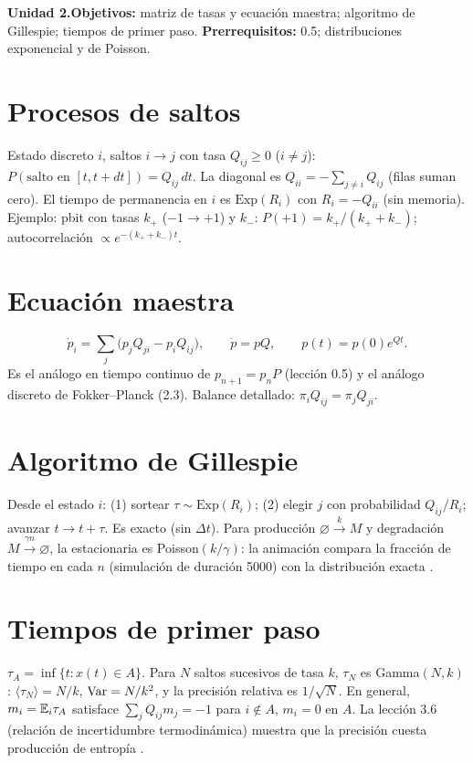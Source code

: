 \documentclass[11pt,a4paper]{article}
\begin{document}

\noindent\textbf{Unidad 2.}\quad\textbf{Objetivos:} matriz de tasas y ecuación maestra; algoritmo de Gillespie; tiempos de
primer paso. \textbf{Prerrequisitos:} 0.5; distribuciones exponencial y de Poisson.

\section{Procesos de saltos}
Estado discreto $i$, saltos $i\to j$ con tasa $Q_{ij}\ge0$ ($i\ne j$): $P(\text{salto en }[t,t+dt])=Q_{ij}\,dt$. La diagonal es
$Q_{ii}=-\sum_{j\ne i}Q_{ij}$ (filas suman cero). El tiempo de permanencia en $i$ es $\mathrm{Exp}(R_i)$ con $R_i=-Q_{ii}$ (sin memoria).
Ejemplo: pbit con tasas $k_+$ ($-1\to+1$) y $k_-$: $P(+1)=k_+/(k_++k_-)$; autocorrelación $\propto e^{-(k_++k_-)t}$.

\section{Ecuación maestra}
\begin{equation}\dot p_i=\sum_j\big(p_jQ_{ji}-p_iQ_{ij}\big),\qquad\dot p=pQ,\qquad p(t)=p(0)e^{Qt}.\end{equation}
Es el análogo en tiempo continuo de $p_{n+1}=p_nP$ (lección 0.5) y el análogo discreto de Fokker--Planck (2.3). Balance detallado:
$\pi_iQ_{ij}=\pi_jQ_{ji}$.

\section{Algoritmo de Gillespie}
Desde el estado $i$: (1) sortear $\tau\sim\mathrm{Exp}(R_i)$; (2) elegir $j$ con probabilidad $Q_{ij}/R_i$; avanzar $t\to t+\tau$. Es exacto
(sin $\Delta t$). Para producción $\varnothing\xrightarrow kM$ y degradación $M\xrightarrow{\gamma n}\varnothing$, la estacionaria es Poisson$(k/\gamma)$:
la animación compara la fracción de tiempo en cada $n$ (simulación de duración 5000) con la distribución exacta \evS.

\section{Tiempos de primer paso}
$\tau_A=\inf\{t:x(t)\in A\}$. Para $N$ saltos sucesivos de tasa $k$, $\tau_N$ es Gamma$(N,k)$: $\langle\tau_N\rangle=N/k$, $\operatorname{Var}=N/k^2$, y la
precisión relativa es $1/\sqrt N$. En general, $m_i=\mathbb{E}_i\tau_A$ satisface $\sum_jQ_{ij}m_j=-1$ para $i\notin A$, $m_i=0$ en $A$. La lección 3.6
(relación de incertidumbre termodinámica) muestra que la precisión cuesta producción de entropía \cite{utsumi}.
\end{document}
